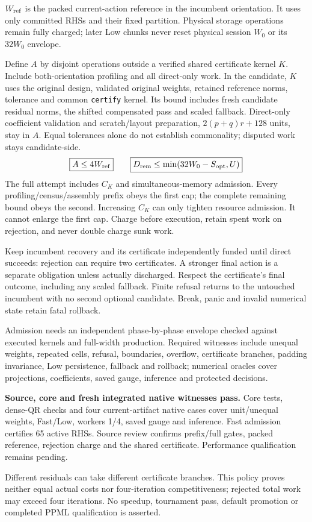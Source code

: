 \documentclass[11pt,letterpaper]{article}
\newcommand{\smallbody}{\fontsize{9.4}{11.65}\selectfont\color{Ink}\RaggedRight}
\newcommand{\sub}[1]{\par\vspace{4pt}{\sffamily\bfseries\fontsize{11.5}{14}\selectfont\color{Teal}#1\par}\vspace{1pt}}
\newcommand{\code}[1]{\texttt{#1}}
\begin{document}
{\smallbody
$W_{\rm ref}$ is the packed current-action reference in the incumbent orientation. It uses only committed RHSs and their fixed partition. Physical storage operations remain fully charged; later Low chunks never reset physical session $W_0$ or its $32W_0$ envelope.

Define $A$ by disjoint operations outside a verified shared certificate kernel $K$. Include both-orientation profiling and all direct-only work. In the candidate, $K$ uses the original design, validated original weights, retained reference norms, tolerance and common \code{certify} kernel. Its bound includes fresh candidate residual norms, the shifted compensated pass and scaled fallback. Direct-only coefficient validation and scratch/layout preparation, $2(p+q)r+128$ units, stay in $A$. Equal tolerances alone do not establish commonality; disputed work stays candidate-side.
\[
\boxed{A\le4W_{\rm ref}}\qquad
\boxed{D_{\rm rem}\le\min(32W_0-S_{\rm opt},U)}
\]
The full attempt includes $C_K$ and simultaneous-memory admission. Every profiling/census/assembly prefix obeys the first cap; the complete remaining bound obeys the second. Increasing $C_K$ can only tighten resource admission. It cannot enlarge the first cap. Charge before execution, retain spent work on rejection, and never double charge sunk work.

Keep incumbent recovery and its certificate independently funded until direct succeeds: rejection can require two certificates. A stronger final action is a separate obligation unless actually discharged. Respect the certificate's final outcome, including any scaled fallback. Finite refusal returns to the untouched incumbent with no second optional candidate. Break, panic and invalid numerical state retain fatal rollback.
}
\sub{Verification boundary}
{\smallbody
Admission needs an independent phase-by-phase envelope checked against executed kernels and full-width production. Required witnesses include unequal weights, repeated cells, refusal, boundaries, overflow, certificate branches, padding invariance, Low persistence, fallback and rollback; numerical oracles cover projections, coefficients, saved gauge, inference and protected decisions.

\textbf{Source, core and fresh integrated native witnesses pass.} Core tests, dense-QR checks and four current-artifact native cases cover unit/unequal weights, Fast/Low, workers 1/4, saved gauge and inference. Fast admission certifies 65 active RHSs. Source review confirms prefix/full gates, packed reference, rejection charge and the shared certificate. Performance qualification remains pending.

Different residuals can take different certificate branches. This policy proves neither equal actual costs nor four-iteration competitiveness; rejected total work may exceed four iterations. No speedup, tournament pass, default promotion or completed PPML qualification is asserted.
}
\end{document}
